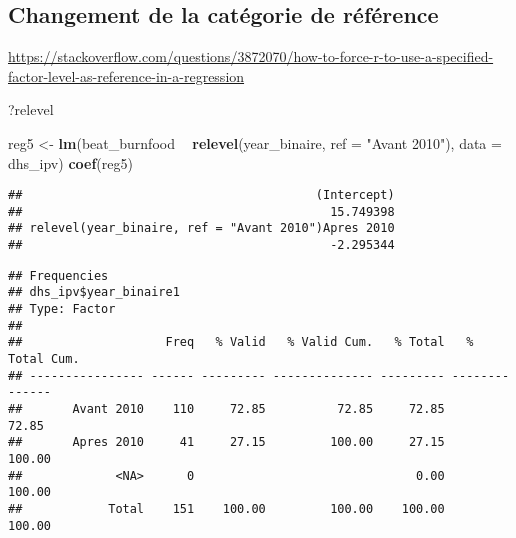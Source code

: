 \documentclass[
]{article}
\newenvironment{Shaded}{\begin{snugshade}}{\end{snugshade}}
\newcommand{\DataTypeTok}[1]{\textcolor[rgb]{0.13,0.29,0.53}{#1}}
\newcommand{\DecValTok}[1]{\textcolor[rgb]{0.00,0.00,0.81}{#1}}
\newcommand{\KeywordTok}[1]{\textcolor[rgb]{0.13,0.29,0.53}{\textbf{#1}}}
\newcommand{\NormalTok}[1]{#1}
\newcommand{\OperatorTok}[1]{\textcolor[rgb]{0.81,0.36,0.00}{\textbf{#1}}}
\newcommand{\StringTok}[1]{\textcolor[rgb]{0.31,0.60,0.02}{#1}}
\begin{document}
\hypertarget{changement-de-la-catuxe9gorie-de-ruxe9fuxe9rence}{%
\subsection{Changement de la catégorie de
référence}\label{changement-de-la-catuxe9gorie-de-ruxe9fuxe9rence}}

\url{https://stackoverflow.com/questions/3872070/how-to-force-r-to-use-a-specified-factor-level-as-reference-in-a-regression}

\begin{Shaded}
\begin{Highlighting}[]
\NormalTok{?relevel}

\NormalTok{reg5 <-}\StringTok{ }\KeywordTok{lm}\NormalTok{(beat_burnfood }\OperatorTok{~}\StringTok{ }\KeywordTok{relevel}\NormalTok{(year_binaire, }\DataTypeTok{ref =} \StringTok{"Avant 2010"}\NormalTok{), }\DataTypeTok{data =}\NormalTok{ dhs_ipv)}
\KeywordTok{coef}\NormalTok{(reg5)}
\end{Highlighting}
\end{Shaded}

\begin{verbatim}
##                                         (Intercept) 
##                                           15.749398 
## relevel(year_binaire, ref = "Avant 2010")Apres 2010 
##                                           -2.295344
\end{verbatim}

\begin{Shaded}
\end{Shaded}

\begin{verbatim}
## Frequencies  
## dhs_ipv$year_binaire1  
## Type: Factor  
## 
##                    Freq   % Valid   % Valid Cum.   % Total   % Total Cum.
## ---------------- ------ --------- -------------- --------- --------------
##       Avant 2010    110     72.85          72.85     72.85          72.85
##       Apres 2010     41     27.15         100.00     27.15         100.00
##             <NA>      0                               0.00         100.00
##            Total    151    100.00         100.00    100.00         100.00
\end{verbatim}
\end{document}
